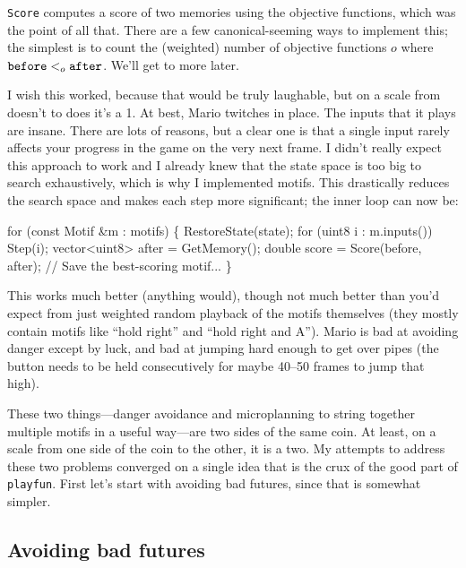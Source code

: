\documentclass[twocolumn]{article}
\begin{document}
{\tt Score} computes a score of two memories using the objective
functions, which was the point of all that. There are a few
canonical-seeming ways to implement this; the simplest is to
count the (weighted) number of objective functions $o$ where
${\tt before} <_o {\tt after}$. We'll get to more later.

I wish this worked, because that would be truly laughable, but
on a scale from doesn't to does it's a 1. At best, Mario twitches
in place. The inputs that it plays are insane. There are lots of
reasons, but a clear one is that a single input rarely affects
your progress in the game on the very next frame. I didn't really
expect this approach to work and I already knew that the state
space is too big to search exhaustively, which is why I implemented
motifs. This drastically reduces the search space and makes each
step more significant; the inner loop can now be:

\begin{code}
for (const Motif &m : motifs) \{
  RestoreState(state);
  for (uint8 i : m.inputs()) Step(i);
  vector<uint8> after = GetMemory();
  double score = Score(before, after);
  // Save the best-scoring motif...
\}
\end{code}

This works much better (anything would), though not much better than
you'd expect from just weighted random playback of the motifs
themselves (they mostly contain motifs like ``hold right'' and ``hold
right and A''). Mario is bad at avoiding danger except by luck, and
bad at jumping hard enough to get over pipes (the button needs to be
held consecutively for maybe 40--50 frames to jump that high).

These two things---danger avoidance and microplanning to string
together multiple motifs in a useful way---are two sides of the same
coin. At least, on a scale from one side of the coin to the other, it
is a two. My attempts to address these two problems converged on a
single idea that is the crux of the good part of {\tt playfun}. First
let's start with avoiding bad futures, since that is somewhat simpler.

\subsection{Avoiding bad futures}
\end{document}
